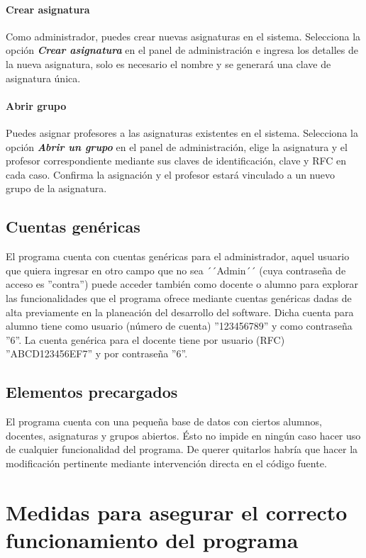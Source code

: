 \documentclass[a4paper,12pt]{article}
\begin{document}
\paragraph{Crear asignatura}
Como administrador, puedes crear nuevas asignaturas en el sistema. Selecciona la opción \textit{\textbf{Crear asignatura}} en el panel de administración e ingresa los detalles de la nueva asignatura, solo es necesario el nombre y se generará una clave de asignatura única.

\paragraph{Abrir grupo}
Puedes asignar profesores a las asignaturas existentes en el sistema. Selecciona la opción \textbf{\textit{Abrir un grupo}} en el panel de administración, elige la asignatura y el profesor correspondiente mediante sus claves de identificación, clave y RFC en cada caso. Confirma la asignación y el profesor estará vinculado a un nuevo grupo de la asignatura.

\subsection{Cuentas genéricas}

El programa cuenta con cuentas genéricas para el administrador, aquel usuario que quiera ingresar en otro campo que no sea ´´Admin´´ (cuya contraseña de acceso es ''contra'') puede acceder también como docente o alumno para explorar las funcionalidades que el programa ofrece mediante cuentas genéricas dadas de alta previamente en la planeación del desarrollo del software. Dicha cuenta para alumno tiene como usuario (número de cuenta) ''123456789'' y como contraseña ''6''. La cuenta genérica para el docente tiene por usuario (RFC) ''ABCD123456EF7'' y por contraseña ''6''.

\subsection{Elementos precargados}

El programa cuenta con una pequeña base de datos con ciertos alumnos, docentes, asignaturas y grupos abiertos. Ésto no impide en ningún caso hacer uso de cualquier funcionalidad del programa. De querer quitarlos habría que hacer la modificación pertinente mediante intervención directa en el código fuente.


\section{Medidas para asegurar el correcto funcionamiento del programa}
\end{document}
